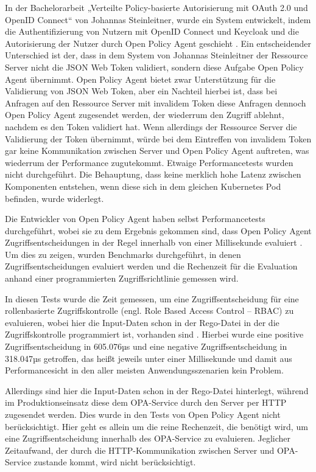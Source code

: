 In der Bachelorarbeit „Verteilte Policy-basierte Autorisierung mit OAuth 2.0 und OpenID Connect“ von Johannas Steinleitner, wurde ein System entwickelt, indem die Authentifizierung von Nutzern mit OpenID Connect und Keycloak und die Autorisierung der Nutzer durch Open Policy Agent geschieht \citep{steinleitner:2020}. Ein entscheidender Unterschied ist der, dass in dem System von Johannas Steinleitner der Ressource Server nicht die JSON Web Token validiert, sondern diese Aufgabe Open Policy Agent übernimmt. Open Policy Agent bietet zwar Unterstützung für die Validierung von JSON Web Token, aber ein Nachteil hierbei ist, dass bei Anfragen auf den Ressource Server mit invalidem Token diese Anfragen dennoch Open Policy Agent zugesendet werden, der wiederrum den Zugriff ablehnt, nachdem es den Token validiert hat. Wenn allerdings der Ressource Server die Validierung der Token übernimmt, würde bei dem Eintreffen von invalidem Token gar keine Kommunikation zwischen Server und Open Policy Agent auftreten, was wiederrum der Performance zugutekommt. Etwaige Performancetests wurden nicht durchgeführt. Die Behauptung, dass keine merklich hohe Latenz zwischen Komponenten entstehen, wenn diese sich in dem gleichen Kubernetes Pod befinden, wurde widerlegt.\bigskip

Die Entwickler von Open Policy Agent haben selbst Performancetests durchgeführt, wobei sie zu dem Ergebnis gekommen sind, dass Open Policy Agent Zugriffsentscheidungen in der Regel innerhalb von einer Millisekunde evaluiert \citep{opaperformance:2021:07}. Um dies zu zeigen, wurden Benchmarks durchgeführt, in denen Zugriffsentscheidungen evaluiert werden und die Rechenzeit für die Evaluation anhand einer programmierten Zugriffsrichtlinie gemessen wird.\smallskip

In diesen Tests wurde die Zeit gemessen, um eine Zugriffsentscheidung für eine rollenbasierte Zugriffskontrolle (engl. Role Based Access Control – RBAC) zu evaluieren, wobei hier die Input-Daten schon in der Rego-Datei in der die Zugriffskontrolle programmiert ist, vorhanden sind \citep{oparbacperformance:2021}. Hierbei wurde eine positive Zugriffsentscheidung in 605.076µs und eine negative Zugriffsentscheidung in 318.047µs getroffen, das heißt jeweils unter einer Millisekunde und damit aus Performancesicht in den aller meisten Anwendungsszenarien kein Problem.\smallskip

Allerdings sind hier die Input-Daten schon in der Rego-Datei hinterlegt, während im Produktionseinsatz diese dem OPA-Service durch den Server per HTTP zugesendet werden. Dies wurde in den Tests von Open Policy Agent nicht berücksichtigt. Hier geht es allein um die reine Rechenzeit, die benötigt wird, um eine Zugriffsentscheidung innerhalb des OPA-Service zu evaluieren. Jeglicher Zeitaufwand, der durch die HTTP-Kommunikation zwischen Server und OPA-Service zustande kommt, wird nicht berücksichtigt.\smallskip

